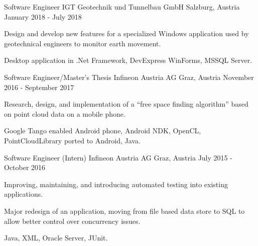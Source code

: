 \begin{cventries}
    \cventry
    {Software Engineer} %
    {IGT Geotechnik und Tunnelbau GmbH} %
    {Salzburg, Austria} %
    {January 2018 - July 2018} %
    {
      \begin{cvitems} %
        \item {Design and develop new features for a specialized Windows application used by geotechnical engineers to monitor earth movement.}
        \item {Desktop application in .Net Framework, DevExpress WinForms, MSSQL Server.}
      \end{cvitems}
    }

    \cventry
    {Software Engineer/Master's Thesis} %
    {Infineon Austria AG} %
    {Graz, Austria} %
    {November 2016 - September 2017} %
    {
      \begin{cvitems} %
        \item {Research, design, and implementation of a “free space finding algorithm” based on point cloud data on a mobile phone.}
        \item {Google Tango enabled Android phone, Android NDK, OpenCL, PointCloudLibrary ported to Android, Java.}
      \end{cvitems}
    }

    \cventry
    {Software Engineer (Intern)} %
    {Infineon Austria AG} %
    {Graz, Austria} %
    {July 2015 - October 2016} %
    {
      \begin{cvitems} %
        \item {Improving, maintaining, and introducing automated testing into existing applications.}
        \item {Major redesign of an application, moving from file based data store to SQL to allow better control over concurrency issues.}
        \item {Java, XML, Oracle Server, JUnit.}
      \end{cvitems}
    }
\end{cventries}
